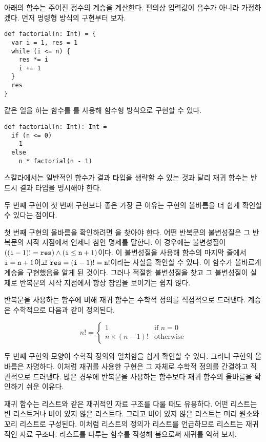 아래의  함수는 주어진 정수의 계승을 계산한다. 편의상 입력값이 음수가
아니라 가정하겠다. 먼저 명령형 방식의 구현부터 보자.

\begin{verbatim}
def factorial(n: Int) = {
  var i = 1, res = 1
  while (i <= n) {
    res *= i
    i += 1
  }
  res
}
\end{verbatim}

같은 일을 하는 함수를 를 사용해 함수형 방식으로 구현할 수 있다.

\begin{verbatim}
def factorial(n: Int): Int =
  if (n <= 0)
    1
  else
    n * factorial(n - 1)
\end{verbatim}

스칼라에서는 일반적인 함수가 결과 타입을 생략할 수 있는 것과 달리 재귀 함수는
반드시 결과 타입을 명시해야 한다.

두 번째 구현이 첫 번째 구현보다 좋은 가장 큰 이유는 구현의 올바름을 더 쉽게
확인할 수 있다는 점이다.

첫 번째 구현의 올바름을 확인하려면 을 찾아야
한다. 어떤 반복문의 불변성질은 그 반복문의 시작 지점에서 언제나 참인 명제를
말한다. 이 경우에는 불변성질이 $((\texttt{i}-1)!=\texttt{res})\land(\texttt{i}\le\texttt{n}+1)$이다.
이 불변성질을 사용해 함수의 마지막 줄에서
$\texttt{i}=\texttt{n}+1$이고 $\texttt{res}=(\texttt{i}-1)!=\texttt{n}!$이라는
사실을 확인할 수 있다. 이 함수가 올바르게 계승을
구현했음을 알게 된 것이다. 그러나 적절한 불변성질을 찾고 그 불변성질이 실제로
반복문의 시작 지점에서 항상 참임을 보이기는 쉽지 않다.

반복문을 사용하는 함수에 비해 재귀 함수는 수학적 정의를 직접적으로 드러낸다.
계승은 수학적으로 다음과 같이 정의된다.

\[n!=\begin{cases}1 & \text{if } n=0\\n \times (n-1)! &
\text{otherwise}\end{cases}\]

두 번째 구현의 모양이 수학적 정의와 일치함을 쉽게 확인할 수 있다. 그러니 구현의
올바름은 자명하다. 이처럼 재귀를 사용한 구현은 그 자체로 수학적 정의를 간결하고
직관적으로 드러낸다. 많은 경우에 반복문을 사용하는 함수보다 재귀 함수의 올바름을
확인하기 쉬운 이유다.

재귀 함수는 리스트와 같은 재귀적인 자료 구조를 다룰 때도 유용하다. 어떤 리스트는
빈 리스트거나 비어 있지 않은 리스트다. 그리고 비어 있지 않은 리스트는 머리
원소와 꼬리 리스트로 구성된다. 이처럼 리스트의 정의가 리스트를 언급하므로
리스트는 재귀적인 자료 구조다. 리스트를 다루는 함수를 작성해 봄으로써
재귀를 익혀 보자.

